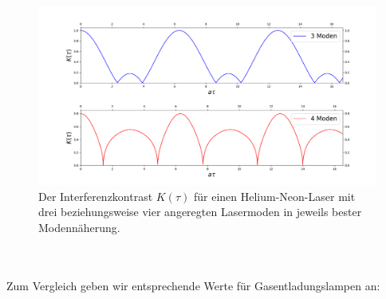 \documentclass[german,  %
parskip=full,  %
]{scrartcl}
\begin{document}
\begin{figure}[h!]\centering
\includegraphics[scale=0.4]{Kontrast_3_und_4_Moden.png}
\caption{Der Interferenzkontrast \(K(\tau)\) für einen Helium-Neon-Laser mit drei beziehungsweise vier angeregten Lasermoden in jeweils bester Modennäherung.}
\label{Kontrast_real}
\end{figure} \\\\
Zum Vergleich geben wir entsprechende Werte für Gasentladungslampen an: 
\end{document}
